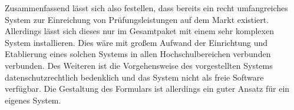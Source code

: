Zusammenfassend lässt sich also festellen, dass bereits ein recht umfangreiches System zur Einreichung von Prüfungsleistungen auf dem Markt existiert. Allerdings lässt sich dieses nur im Gesamtpaket mit einem sehr komplexen System installieren. Dies wäre mit großem Aufwand der Einrichtung und Etablierung eines solchen Systems in allen Hochschulbereichen verbunden verbunden. Des Weiteren ist die Vorgehensweise des vorgestellten Systems datenschutzrechtlich bedenklich und das System nicht als freie Software verfügbar. Die Gestaltung des Formulars ist allerdings ein guter Ansatz für ein eigenes System.
